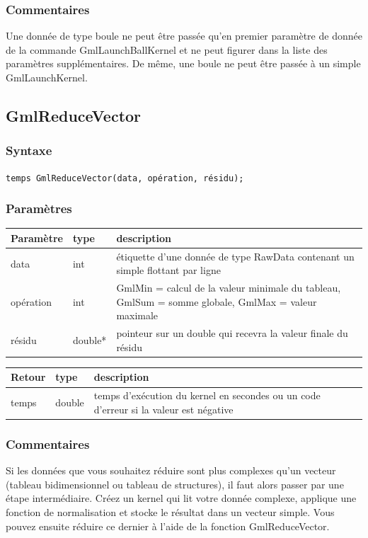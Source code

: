 \documentclass[a4paper,12pt]{article}
\begin{document}
\subsubsection*{Commentaires}
Une donnée de type boule ne peut être passée qu'en premier paramètre de donnée de la commande GmlLaunchBallKernel et ne peut figurer dans la liste des paramètres supplémentaires. De même, une boule ne peut être passée à un simple GmlLaunchKernel.


\subsection{GmlReduceVector}
\subsubsection*{Syntaxe}
{\tt temps GmlReduceVector(data, opération, résidu);}
\subsubsection*{Paramètres}

\begin{tabular}{|m{2cm}|m{1.5cm}|m{10.5cm}|}
\hline
Paramètre  & type   & description \\
\hline
data       & int    & étiquette d'une donnée de type RawData contenant un simple flottant par ligne \\
\hline
opération & int    & GmlMin = calcul de la valeur minimale du tableau, GmlSum = somme globale, GmlMax = valeur maximale \\
\hline
résidu     & double*& pointeur sur un double qui recevra la valeur finale du résidu \\
\hline
\end{tabular}

\medskip

\begin{tabular}{|m{2cm}|m{1.5cm}|m{10.5cm}|}
\hline
Retour     & type   & description \\
\hline
temps      & double & temps d'exécution du kernel en secondes ou un code d'erreur si la valeur est négative \\
\hline
\end{tabular}
\subsubsection*{Commentaires}
Si les données que vous souhaitez réduire sont plus complexes qu'un vecteur (tableau bidimensionnel ou tableau de structures), il faut alors passer par une étape intermédiaire. Créez un kernel qui lit votre donnée complexe, applique une fonction de normalisation et stocke le résultat dans un vecteur simple. Vous pouvez ensuite réduire ce dernier à l'aide de la fonction GmlReduceVector.
\end{document}
